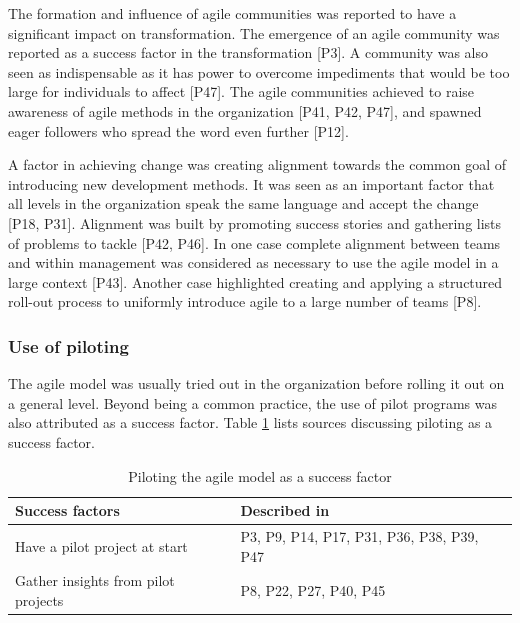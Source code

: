 \documentclass[preprint,authoryear,12pt]{elsarticle}
\begin{document}

The formation and influence of agile communities was reported to have a
significant impact on transformation.
The emergence of an agile community was reported as a success factor in the
transformation [P3]. A community was also seen as indispensable as it has power
to overcome impediments that would be too large for individuals to affect [P47].
The agile communities achieved to raise awareness of agile methods in the
organization [P41, P42, P47], and spawned eager followers who spread the word
even further [P12].


A factor in achieving change was creating alignment towards the common goal of
introducing new development methods. It was seen as an important factor that all
levels in the organization speak the same language and accept the change [P18,
P31]. Alignment was built by promoting success stories and gathering lists of
problems to tackle [P42, P46]. In one case complete alignment between teams and
within management was considered as necessary to use the agile model in a large
context [P43]. Another case highlighted creating and applying a structured
roll-out process to uniformly introduce agile to a large number of teams [P8].


\subsubsection{Use of piloting}

The agile model was usually tried out in the organization before rolling it out
on a general level. Beyond being a common practice, the use of pilot programs
was also attributed as a success factor. Table \ref{table:success_pilots} lists
sources discussing piloting as a success factor.

\begin{table}[h]
    \centering
    \begin{tabular}{ >{\raggedright\arraybackslash}p{}
                     >{\raggedright\arraybackslash}p{} }
        \toprule
        Success factors  &  Described in \\
        \midrule
        Have a pilot project at start  &
                P3, P9, P14, P17, P31, P36, P38, P39, P47  \\
        Gather insights from pilot projects  &
                P8, P22, P27, P40, P45  \\
        \bottomrule
    \end{tabular}
    \caption{Piloting the agile model as a success factor}
    \label{table:success_pilots}
\end{table}
\end{document}
